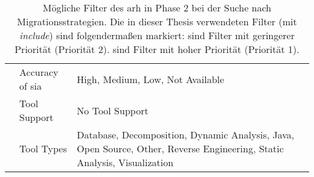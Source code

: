 \begin{table}
\begin{tabular}{m{2cm} m{2cm} m{9cm}}
    & Accuracy of \gls{sia} & High, Medium, Low, Not Available \\ \cline{2-3}
    & Tool Support & No Tool Support \\ \cline{2-3}
    & Tool Types & Database, Decomposition, Dynamic Analysis, Java, Open Source, Other, Reverse Engineering, Static Analysis, Visualization \\
    \bottomrule
  \end{tabular}
  \caption[Mögliche Filter des \gls{arh} in Phase 2]{
  	Mögliche Filter des \gls{arh} in Phase 2 bei der Suche nach Migrationsstrategien.
  	Die in dieser Thesis verwendeten Filter (mit \emph{include}) sind folgendermaßen markiert:
     sind Filter mit geringerer Priorität (Priorität 2).
     sind Filter mit hoher Priorität (Priorität 1).
  }
  \label{tab:phase2-all-filter}
\end{table}
